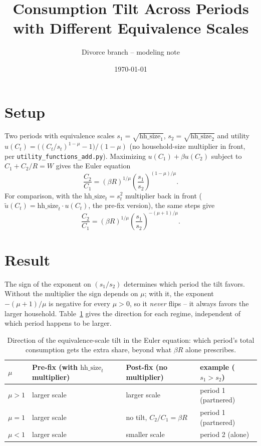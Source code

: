 \documentclass[11pt]{article}
\title{Consumption Tilt Across Periods with Different Equivalence Scales}
\author{Divorce branch -- modeling note}
\date{\today}
\begin{document}
\sloppy
\maketitle

\section{Setup}

Two periods with equivalence scales $s_1 = \sqrt{\text{hh\_size}_1}$,
$s_2 = \sqrt{\text{hh\_size}_2}$ and utility
$u(C_t) = \big((C_t/s_t)^{1-\mu} - 1\big)/(1-\mu)$ (no household-size
multiplier in front, per \texttt{utility\_functions\_add.py}). Maximizing
$u(C_1) + \beta u(C_2)$ subject to $C_1 + C_2/R = W$ gives the Euler
equation
\begin{equation}
  \frac{C_2}{C_1} = (\beta R)^{1/\mu} \left(\frac{s_1}{s_2}\right)^{(1-\mu)/\mu}.
\end{equation}
For comparison, with the $\text{hh\_size}_t = s_t^2$ multiplier back in
front ($\tilde u(C_t) = \text{hh\_size}_t \cdot u(C_t)$, the pre-fix
version), the same steps give
\begin{equation}
  \frac{C_2}{C_1} = (\beta R)^{1/\mu} \left(\frac{s_1}{s_2}\right)^{-(\mu+1)/\mu}.
\end{equation}

\section{Result}

The sign of the exponent on $(s_1/s_2)$ determines which period the tilt
favors. Without the multiplier the sign depends on $\mu$; with it, the
exponent $-(\mu+1)/\mu$ is negative for every $\mu>0$, so it \emph{never}
flips -- it always favors the larger household. Table~\ref{tab:tilt} gives
the direction for each regime, independent of which period happens to be
larger.

\begin{table}[h]
\centering
\begin{tabular}{@{}llll@{}}
\toprule
$\mu$ & Pre-fix (with $\text{hh\_size}_t$ multiplier) & Post-fix (no multiplier) & example ($s_1>s_2$) \\
\midrule
$\mu > 1$ & larger scale & larger scale & period 1 (partnered) \\
$\mu = 1$ & larger scale & no tilt, $C_2/C_1=\beta R$ & period 1 (partnered) \\
$\mu < 1$ & larger scale & smaller scale & period 2 (alone) \\
\bottomrule
\end{tabular}
\caption{Direction of the equivalence-scale tilt in the Euler equation:
which period's total consumption gets the extra share, beyond what
$\beta R$ alone prescribes.}
\label{tab:tilt}
\end{table}
\end{document}
